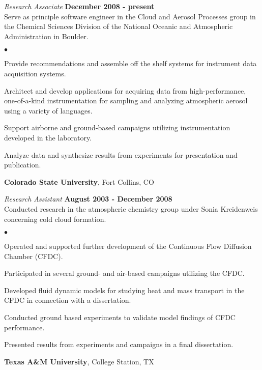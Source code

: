 \documentclass[margin,line]{res}
\newenvironment{list2}{
  \begin{list}{$\bullet$}{%
      \setlength{\itemsep}{0in}
      \setlength{\parsep}{0in} \setlength{\parskip}{0in}
      \setlength{\topsep}{0in} \setlength{\partopsep}{0in} 
      \setlength{\leftmargin}{0.2in}}}{\end{list}}
\begin{document}
\begin{resume}
\vspace{-.3cm}
{\em Research Associate} \hfill {\bf December 2008 - present}\\
Serve as principle software engineer in the Cloud and Aerosol Processes group in the Chemical Sciences Division of the National Oceanic and Atmospheric Administration in Boulder.  
\vspace*{.05in} 
\begin{list2}
	\item Provide recommendations and assemble off the shelf systems for instrument data acquisition systems.
	\item Architect and develop applications for acquiring data from high-performance, one-of-a-kind instrumentation for sampling and analyzing atmospheric aerosol using a variety of languages.
	\item Support airborne and ground-based campaigns utilizing instrumentation developed in the laboratory.
	\item Analyze data and synthesize results from experiments for presentation and publication.
\end{list2}


{\bf Colorado State University}, Fort Collins, CO

\vspace{-.3cm}
{\em Research Assistant} \hfill {\bf August 2003 - December 2008}\\
Conducted research in the atmospheric chemistry group under Sonia Kreidenweis concerning cold cloud formation. 
\vspace*{.05in}  
\begin{list2}
	\item Operated and supported further development of the Continuous Flow Diffusion Chamber (CFDC).
	\item Participated in several ground- and air-based campaigns utilizing the CFDC.
	\item Developed fluid dynamic models for studying heat and mass transport in the CFDC in connection with a dissertation.
	\item Conducted ground based experiments to validate model findings of CFDC performance.
	\item Presented results from experiments and campaigns in a final dissertation.
\end{list2}


{\bf Texas A\&M University}, College Station, TX


\end{resume}
\end{document}
